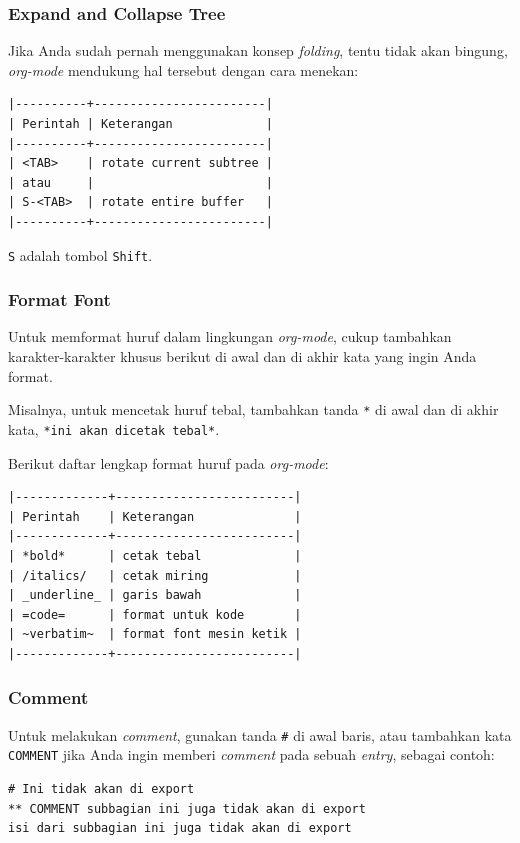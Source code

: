 \documentclass{article}
\begin{document}
\subsubsection{Expand and Collapse Tree}
Jika Anda sudah pernah menggunakan konsep \emph{folding}, tentu tidak akan
bingung, \emph{org-mode} mendukung hal tersebut dengan cara menekan:

\begin{verbatim}
|----------+------------------------|
| Perintah | Keterangan             |
|----------+------------------------|
| <TAB>    | rotate current subtree |
| atau     |                        |
| S-<TAB>  | rotate entire buffer   |
|----------+------------------------|
\end{verbatim}

\verb=S= adalah tombol \verb=Shift=.

\subsubsection{Format Font}
Untuk memformat huruf dalam lingkungan \emph{org-mode}, cukup tambahkan
karakter-karakter khusus berikut di awal dan di akhir kata yang ingin 
Anda format.

Misalnya, untuk mencetak huruf tebal, tambahkan tanda \verb=*= di awal
dan di akhir kata, \verb=*ini akan dicetak tebal*=.

Berikut daftar lengkap format huruf pada \emph{org-mode}:

\begin{verbatim}
|-------------+-------------------------|
| Perintah    | Keterangan              |
|-------------+-------------------------|
| *bold*      | cetak tebal             |
| /italics/   | cetak miring            |
| _underline_ | garis bawah             |
| =code=      | format untuk kode       |
| ~verbatim~  | format font mesin ketik |
|-------------+-------------------------|
\end{verbatim}

\subsubsection{Comment}
Untuk melakukan \emph{comment}, gunakan tanda \verb=#= di awal baris, atau
tambahkan kata \verb=COMMENT= jika Anda ingin memberi \emph{comment} pada
sebuah \emph{entry}, sebagai contoh:

\begin{verbatim}
# Ini tidak akan di export
** COMMENT subbagian ini juga tidak akan di export
isi dari subbagian ini juga tidak akan di export
\end{verbatim}
\end{document}
